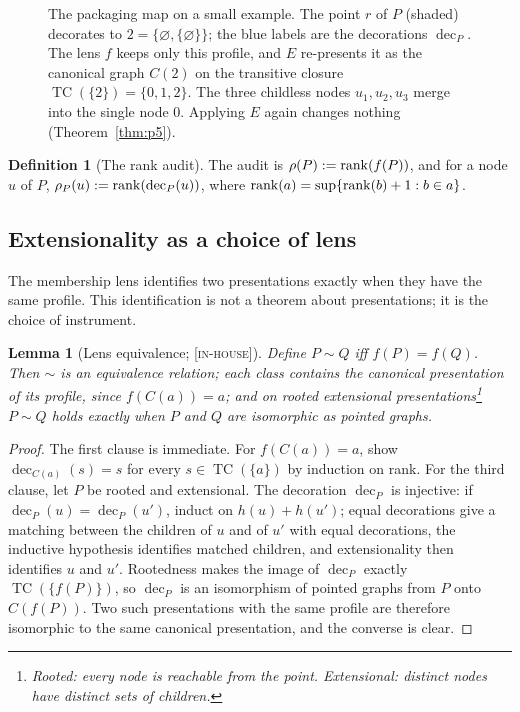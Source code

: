 \documentclass[11pt]{article}
\newcommand{\TC}{\operatorname{TC}}
\newcommand{\dec}{\operatorname{dec}}
\newcommand{\gradetag}[1]{\textnormal{\textsc{[#1]}}}
\newcommand{\inhouse}{\gradetag{in-house}}
\newtheorem{lemma}[theorem]{Lemma}
\theoremstyle{definition}
\newtheorem{definition}[theorem]{Definition}
\begin{document}
\begin{figure}[tbp]
\caption{The packaging map on a small example. The point $r$ of $P$ (shaded) decorates to
$2=\{\varnothing,\{\varnothing\}\}$; the blue labels are the decorations $\dec_P$. The lens $f$ keeps only
this profile, and $E$ re-presents it as the canonical graph $C(2)$ on the transitive closure
$\TC(\{2\})=\{0,1,2\}$. The three childless nodes $u_1,u_2,u_3$ merge into the single node $0$.
Applying $E$ again changes nothing (Theorem~\ref{thm:p5}).}
\label{fig:packaging}
\end{figure}
 
\begin{definition}[The rank audit]\label{def:rank}
The audit is $\rho(P):=\operatorname{rank}(f(P))$, and for a node $u$ of $P$, $\rho_P(u):=\rank(\dec_P(u))$,
where $\operatorname{rank}(a)=\sup\{\operatorname{rank}(b)+1: b\in a\}$.
\end{definition}

\subsection{Extensionality as a choice of lens}

The membership lens identifies two presentations exactly when they have the same profile. This
identification is not a theorem about presentations; it is the choice of instrument.

\begin{lemma}[Lens equivalence; \inhouse]\label{lem:L2}
Define $P\sim Q$ iff $f(P)=f(Q)$. Then $\sim$ is an equivalence relation; each class contains the
canonical presentation of its profile, since $f(C(a))=a$; and on rooted extensional
presentations\footnote{Rooted: every node is reachable from the point. Extensional: distinct
nodes have distinct sets of children.} $P\sim Q$ holds exactly when $P$ and $Q$ are isomorphic as
pointed graphs.
\end{lemma}

\begin{proof}
The first clause is immediate. For $f(C(a))=a$, show $\dec_{C(a)}(s)=s$ for every
$s\in\TC(\{a\})$ by induction on rank. For the third clause, let $P$ be rooted and extensional.
The decoration $\dec_P$ is injective: if $\dec_P(u)=\dec_P(u')$, induct on $h(u)+h(u')$; equal
decorations give a matching between the children of $u$ and of $u'$ with equal decorations, the
inductive hypothesis identifies matched children, and extensionality then identifies $u$ and
$u'$. Rootedness makes the image of $\dec_P$ exactly $\TC(\{f(P)\})$, so $\dec_P$ is an
isomorphism of pointed graphs from $P$ onto $C(f(P))$. Two such presentations with the same
profile are therefore isomorphic to the same canonical presentation, and the converse is clear.
\end{proof}
\end{document}

